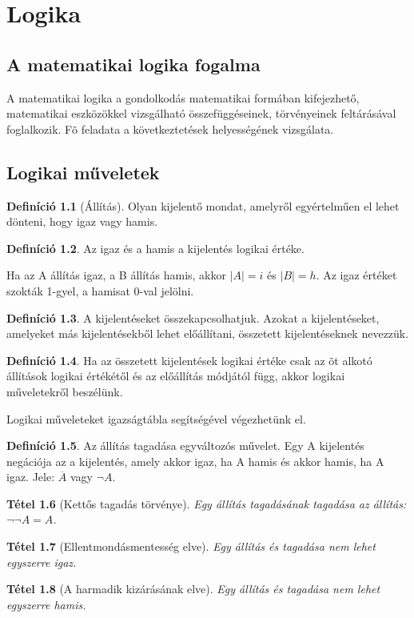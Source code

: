 \documentclass[twoside,12pt]{report}
\newtheorem{theorem}{Tétel}[section]
\theoremstyle{definition}
\newtheorem{definition}[theorem]{Definíció}
\begin{document}
\chapter{Logika}
\section{A matematikai logika fogalma}
	A matematikai logika a gondolkodás matematikai formában kifejezhető, matematikai eszközökkel	vizsgálható összefüggéseinek, törvényeinek feltárásával foglalkozik. Fõ feladata a következtetések helyességének vizsgálata.
\section{Logikai műveletek}
	\begin{definition}[Állítás]
		Olyan kijelentő mondat, amelyről egyértelműen el lehet dönteni, hogy igaz vagy hamis.
	\end{definition}
	\begin{definition}
		Az igaz és a hamis a kijelentés logikai értéke.
	\end{definition}
	Ha az A állítás igaz, a B állítás hamis, akkor $|A|=i$ és $|B|=h$. Az igaz értéket szokták 1-gyel, a hamisat 0-val jelölni.
	\begin{definition}
		A kijelentéseket összekapcsolhatjuk. Azokat a kijelentéseket, amelyeket más kijelentésekből lehet előállítani, összetett kijelentéseknek nevezzük.
	\end{definition}
	\begin{definition}
		Ha az összetett kijelentések logikai értéke csak az õt alkotó állítások logikai értékétől és az előállítás módjától függ, akkor logikai műveletekről beszélünk.
	\end{definition}
	Logikai műveleteket igazságtábla segítségével végezhetünk el.
	\begin{definition}
		Az állítás tagadása egyváltozós művelet. Egy A kijelentés negációja	az a kijelentés, amely akkor igaz, ha A hamis és akkor hamis, ha A igaz. Jele: $\overline{A}$  vagy $\neg A$.
	\end{definition}
	\begin{theorem}[Kettős tagadás törvénye]
		Egy állítás tagadásának tagadása az állítás: $\neg\neg A=A$.
	\end{theorem}
	\begin{theorem}[Ellentmondásmentesség elve]
		Egy állítás és tagadása nem lehet egyszerre igaz.
	\end{theorem}
	\begin{theorem}[A harmadik kizárásának elve]
		Egy állítás és tagadása nem lehet egyszerre hamis.
	\end{theorem}
\end{document}
